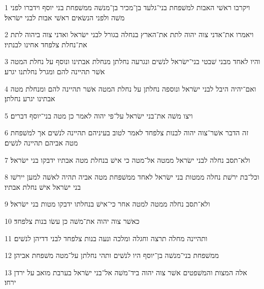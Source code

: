 \par 1 ויקרבו ראשׁי האבות למשׁפחת בני־גלעד בן־מכיר בן־מנשׁה ממשׁפחת בני יוסף וידברו לפני משׁה ולפני הנשׂאים ראשׁי אבות לבני ישׂראל׃
\par 2 ויאמרו את־אדני צוה יהוה לתת את־הארץ בנחלה בגורל לבני ישׂראל ואדני צוה ביהוה לתת את־נחלת צלפחד אחינו לבנתיו׃
\par 3 והיו לאחד מבני שׁבטי בני־ישׂראל לנשׁים ונגרעה נחלתן מנחלת אבתינו ונוסף על נחלת המטה אשׁר תהיינה להם ומגרל נחלתנו יגרע׃
\par 4 ואם־יהיה היבל לבני ישׂראל ונוספה נחלתן על נחלת המטה אשׁר תהיינה להם ומנחלת מטה אבתינו יגרע נחלתן׃
\par 5 ויצו משׁה את־בני ישׂראל על־פי יהוה לאמר כן מטה בני־יוסף דברים׃
\par 6 זה הדבר אשׁר־צוה יהוה לבנות צלפחד לאמר לטוב בעיניהם תהיינה לנשׁים אך למשׁפחת מטה אביהם תהיינה לנשׁים׃
\par 7 ולא־תסב נחלה לבני ישׂראל ממטה אל־מטה כי אישׁ בנחלת מטה אבתיו ידבקו בני ישׂראל׃
\par 8 וכל־בת ירשׁת נחלה ממטות בני ישׂראל לאחד ממשׁפחת מטה אביה תהיה לאשׁה למען יירשׁו בני ישׂראל אישׁ נחלת אבתיו׃
\par 9 ולא־תסב נחלה ממטה למטה אחר כי־אישׁ בנחלתו ידבקו מטות בני ישׂראל׃
\par 10 כאשׁר צוה יהוה את־משׁה כן עשׂו בנות צלפחד׃
\par 11 ותהיינה מחלה תרצה וחגלה ומלכה ונעה בנות צלפחד לבני דדיהן לנשׁים׃
\par 12 ממשׁפחת בני־מנשׁה בן־יוסף היו לנשׁים ותהי נחלתן על־מטה משׁפחת אביהן׃
\par 13 אלה המצות והמשׁפטים אשׁר צוה יהוה ביד־משׁה אל־בני ישׂראל בערבת מואב על ירדן ירחו׃



